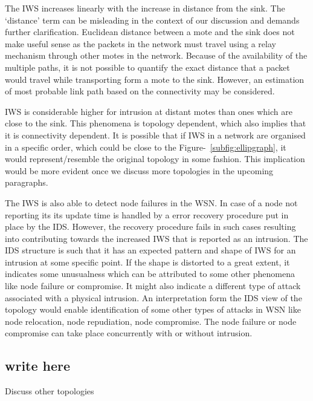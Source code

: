 \documentclass[conference,final]{IEEEtran}
\begin{document}
The IWS increases linearly with the increase in distance from the sink.
The `distance' term can be misleading in the context of our discussion and demands further clarification.
Euclidean distance between a mote and the sink does not make useful sense as the packets in the network must travel using a relay mechanism through other motes in the network.
Because of the availability of the multiple paths, it is not possible to quantify the exact distance that a packet would travel while transporting form a mote to the sink.
However, an estimation of most probable link path based on the connectivity may be considered.

IWS is considerable higher for intrusion at distant motes than ones which are close to the sink.
This phenomena is topology dependent, which also implies   that it is connectivity dependent.
It is possible that if IWS in a network are organised in a specific order, which could be close to the Figure-~\ref{subfig:ellipgraph}, it would represent/resemble   the original topology in some fashion.
This implication would be more evident once we discuss more topologies in the upcoming paragraphs.

The IWS is also able to detect node failures in the WSN.
In case of a node not reporting its its update time is handled by a error recovery procedure put in place by the IDS.
However, the recovery procedure fails in such cases resulting into contributing towards the increased IWS that is reported as an intrusion.
The IDS structure is such that it has an expected pattern and shape of IWS for an intrusion at some specific point.
If the shape is distorted to a great extent, it indicates some unusualness which can be attributed to some other phenomena like node failure or compromise.
It might also indicate a different type of attack associated with a physical intrusion.
An interpretation form the IDS view of the topology would enable identification of some other types of attacks in WSN like node relocation, node repudiation, node compromise.
The node failure or node compromise can take place concurrently with or without intrusion.


\subsection{write here}

Discuss other topologies
\end{document}
